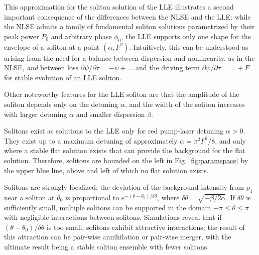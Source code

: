 This approximation for the soliton solution of the LLE illustrates a second important consequence of the differences between the NLSE and the LLE: while the NLSE admits a family of fundamental soliton solutions parametrized by their peak power $P_0$ and arbitrary phase $\phi_0$, the LLE supports only one shape for the envelope of a soliton at a point $(\alpha,F^2)$. Intuitively, this can be understood as arising from the need for a balance between dispersion and nonlinearity, as in the NLSE, \textit{and} between loss $\partial\psi/\partial\tau=-\psi+...$ and the driving term $\partial\psi/\partial\tau=...+F$ for stable evolution of an LLE soliton.

Other noteworthy features for the LLE soliton are that the amplitude of the soliton depends only on the detuning $\alpha$, and the width of the soliton increases with larger detuning $\alpha$ and smaller dispersion $\beta$.

Solitons exist as solutions to the LLE only for red pump-laser detuning $\alpha>0$. They exist up to a maximum detuning of approximately $\alpha=\pi^2 F^2/8$, and only where a stable flat solution exists that can provide the background for the flat solution. Therefore, solitons are bounded on the left in Fig. \ref{fig:paramspace} by the upper blue line, above and left of which no flat solution exists.

Solitons are strongly localized: the deviation of the background intensity from $\rho_1$ near a soliton at $\theta_0$ is proportional to $e^{-(\theta-\theta_0)/\delta\theta}$, where $\delta\theta=\sqrt{-\beta/2\alpha}$. If $\delta\theta$ is sufficiently small, multiple solitons can be supported in the domain $-\pi\leq\theta\leq\pi$ with negligible interactions between solitons. Simulations reveal that if $(\theta-\theta_0)/\delta\theta$ is too small, solitons exhibit attractive interactions; the result of this attraction can be pair-wise annihilation or pair-wise merger, with the ultimate result being a stable soliton ensemble with fewer solitons.


%



